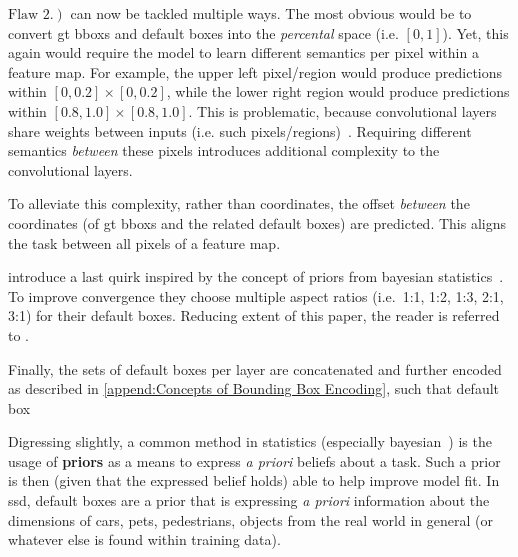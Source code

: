 \hyperref[itm:anchor-flaw2]{\(\left.\text{Flaw 2}.\right)\)} can now be tackled
multiple ways. The most obvious would be to convert \gls{gt} \glspl{bbox} and
default boxes into the \textit{percental} space (i.e. \(\left[0, 1\right]\)).
Yet, this again would require the model to learn different semantics per pixel
within a \gls{feature map}. For example, the upper left pixel/region would produce predictions
within \(\left[0,0.2\right]\times \left[0,0.2\right]\), while the lower right
region would produce predictions within \(\left[0.8,1.0\right]\times \left[0.8,1.0\right]\).
This is problematic, because \glspl{convolutional layer} share weights\footnotemark{}
between inputs (i.e. such pixels/regions)~\cite[cf.][564\psqq]{Murphy.2012}.
Requiring different semantics \emph{between} these pixels introduces additional
complexity to the \glspl{convolutional layer}.

To alleviate this complexity, rather than coordinates, the offset \emph{between}
the coordinates (of \gls{gt} \glspl{bbox} and the related default boxes) are predicted.
This aligns the task between all pixels of a \gls{feature map}.

\Textcite{Liu.2016} introduce a last quirk inspired by the concept of priors
from bayesian statistics~\cite[cf.][165\psqq]{Murphy.2012}. To improve convergence
they choose multiple aspect ratios (i.e.\ 1:1, 1:2, 1:3, 2:1, 3:1) for their
default boxes. Reducing extent of this paper, the reader is referred to \cite{Liu.2016}.

Finally, the sets of default boxes per \gls{layer} are concatenated and further
encoded as described in \cref{append:Concepts of Bounding Box Encoding}, such
that default box

Digressing slightly, a common method in statistics (especially bayesian~\cite[cf.][165\psqq]{Murphy.2012})
is the usage of \textbf{priors} as a means to express \textit{a priori} beliefs about a task.
Such a prior is then (given that the expressed belief holds) able to help improve
model fit\footnotemark. In \gls{ssd},
default boxes are a prior that is expressing \textit{a priori} information about
the dimensions of cars, pets, pedestrians, objects from the real world in general
(or whatever else is found within training data).


